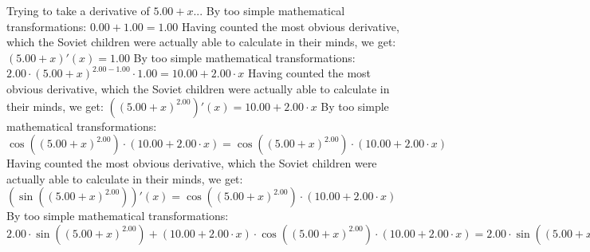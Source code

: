 \documentclass{article}
\begin{document}
\newline
Trying to take a derivative of ${{5.00} + {x}}$...\newline
\newline
By too simple mathematical transformations:
 ${{0.00} + {1.00}} = {1.00}$ 
 \newline
 \newline 
Having counted the most obvious derivative, which the Soviet children were actually able to calculate in their minds, we get:
$({{5.00} + {x}})'(x) = {1.00}$\newline
\newline
By too simple mathematical transformations:
 ${{{2.00} \cdot {\left({{5.00} + {x}}\right) ^ {{2.00} - {1.00}}}} \cdot {1.00}} = {{10.00} + {{2.00} \cdot {x}}}$ 
 \newline
 \newline 
Having counted the most obvious derivative, which the Soviet children were actually able to calculate in their minds, we get:
$({\left({{5.00} + {x}}\right) ^ {2.00}})'(x) = {{10.00} + {{2.00} \cdot {x}}}$\newline
\newline
By too simple mathematical transformations:
 ${ \cos {\left({\left({{5.00} + {x}}\right) ^ {2.00}}\right)}  \cdot \left({{10.00} + {{2.00} \cdot {x}}}\right)} = { \cos {\left({\left({{5.00} + {x}}\right) ^ {2.00}}\right)}  \cdot \left({{10.00} + {{2.00} \cdot {x}}}\right)}$ 
 \newline
 \newline 
Having counted the most obvious derivative, which the Soviet children were actually able to calculate in their minds, we get:
$( \sin {\left({\left({{5.00} + {x}}\right) ^ {2.00}}\right)} )'(x) = { \cos {\left({\left({{5.00} + {x}}\right) ^ {2.00}}\right)}  \cdot \left({{10.00} + {{2.00} \cdot {x}}}\right)}$\newline
\newline
By too simple mathematical transformations:
 ${{{2.00} \cdot  \sin {\left({\left({{5.00} + {x}}\right) ^ {2.00}}\right)} } + {\left({{10.00} + {{2.00} \cdot {x}}}\right) \cdot { \cos {\left({\left({{5.00} + {x}}\right) ^ {2.00}}\right)}  \cdot \left({{10.00} + {{2.00} \cdot {x}}}\right)}}} = {{{2.00} \cdot  \sin {\left({\left({{5.00} + {x}}\right) ^ {2.00}}\right)} } + {\left({{10.00} + {{2.00} \cdot {x}}}\right) \cdot { \cos {\left({\left({{5.00} + {x}}\right) ^ {2.00}}\right)}  \cdot \left({{10.00} + {{2.00} \cdot {x}}}\right)}}}$ 
 \newline
 \newline 
\end{document}
